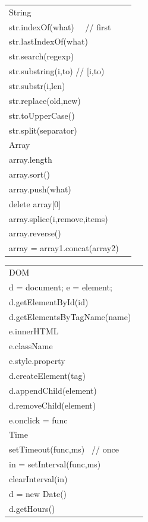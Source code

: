 \documentclass{article}
\begin{document}
\begin{minipage}{0.9\textwidth}
\begin{multicols}{3}
\begin{tabular}{ll}
\multicolumn{2}{l}{\sffamily \color{javascriptyellow} String} \\
str.indexOf(what) \ \ // first                \\
str.lastIndexOf(what)                         \\
str.search(regexp)                            \\
str.substring(i,to) // [i,to)                 \\
str.substr(i,len)                             \\
str.replace(old,new)                          \\
str.toUpperCase()                             \\
str.split(separator)                          \\
\multicolumn{2}{l}{\sffamily \color{javascriptyellow} Array} \\
array.length                           \\
array.sort()                           \\
array.push(what)                       \\
delete array[0]                        \\
array.splice(i,remove,items)           \\
array.reverse()                        \\
array = array1.concat(array2)          
\end{tabular}

\begin{tabular}{ll}
\multicolumn{2}{l}{\sffamily \color{javascriptyellow} DOM} \\
d = document; e = element;         \\
d.getElementById(id)               \\
d.getElementsByTagName(name)       \\
e.innerHTML                        \\
e.className                        \\
e.style.property                   \\
d.createElement(tag)               \\
d.appendChild(element)             \\
d.removeChild(element)             \\
e.onclick = func                   \\
\multicolumn{2}{l}{\sffamily \color{javascriptyellow} Time} \\
setTimeout(func,ms) \ // once      \\
in = setInterval(func,ms)          \\
clearInterval(in)                  \\
d = new Date()                     \\
d.getHours()

\end{tabular}

\end{multicols}
\end{minipage}
\end{document}
